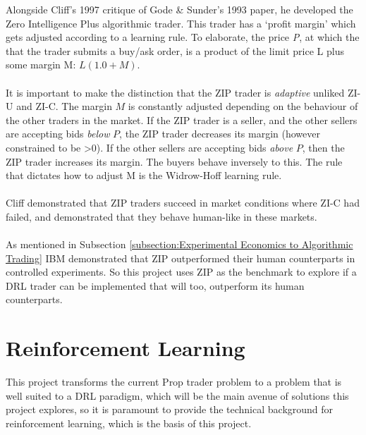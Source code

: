 \documentclass[ %
                    author={Ashwinder Khurana},
                supervisor={Prof Dave Cliff},
                    degree={MEng},
                     title={The Deeply Reinforced Trader},
                  subtitle={},
                      type={enterprise},
                      year={2020} ]{dissertation}
\begin{document}
Alongside Cliff's 1997 critique of Gode \& Sunder's 1993 paper, he developed the Zero Intelligence Plus algorithmic trader. This trader has a \enquote*{profit margin} which gets adjusted according to a learning rule. To elaborate, the price \textit{P}, at which the that the trader submits a buy/ask order, is a product of the limit price L plus some margin M: $L(1.0 + M)$. 
\\
\\
\noindent
It is important to make the distinction that the ZIP trader is \textit{adaptive} unliked ZI-U and ZI-C. The margin $M$ is constantly adjusted depending on the behaviour of the other traders in the market. If the ZIP trader is a seller, and the other sellers are accepting bids \textit{below} $P$, the ZIP trader decreases its margin (however constrained to be \textgreater 0). If the other sellers are accepting bids \textit{above} $P$, then the ZIP trader increases its margin. The buyers behave inversely to this. The rule that dictates how to adjust M is the Widrow-Hoff learning rule.
\\
\\
Cliff demonstrated that ZIP traders succeed in market conditions where ZI-C had failed, and demonstrated that they behave human-like in these markets.   
\\
\\
As mentioned in Subsection \ref{subsection:Experimental Economics to Algorithmic Trading} IBM demonstrated that ZIP outperformed their human counterparts in controlled experiments. So this project uses ZIP as the benchmark to explore if a DRL trader can be implemented that will too, outperform its human counterparts.  

\section{Reinforcement Learning}

This project transforms the current Prop trader problem to a problem that is well suited to a DRL paradigm, which will be the main avenue of solutions this project explores, so it is paramount to provide the technical background for reinforcement learning, which is the basis of this project.
\end{document}
